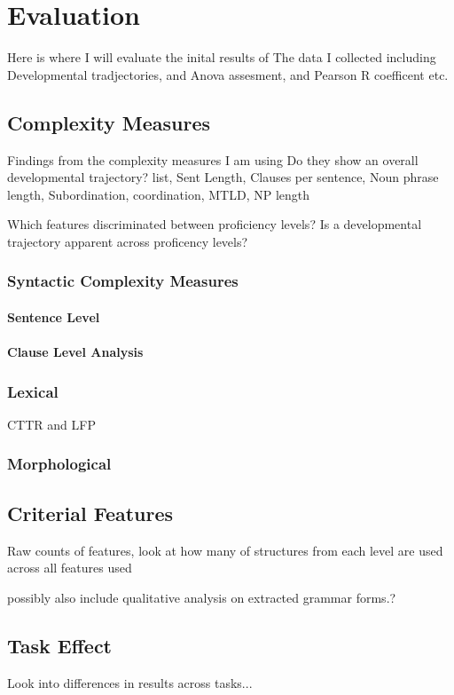 \chapter{Evaluation} 
Here is where I will evaluate the inital results of The data I collected including Developmental tradjectories, and 
Anova assesment, and Pearson R coefficent etc. 
\section{Complexity Measures}
Findings from the complexity measures I am using
Do they show an overall developmental trajectory?
list, Sent Length, Clauses per sentence, Noun phrase length,  Subordination, coordination, MTLD, NP length

Which features discriminated between proficiency levels?
Is a developmental trajectory apparent across proficency levels?

\subsection{Syntactic Complexity Measures}
\subsubsection{Sentence Level}


\subsubsection{Clause Level Analysis}

\subsection{Lexical}
CTTR and LFP 

\subsection{Morphological}


\section{Criterial Features}
Raw counts of features, 
look at how many of structures from each level are used across all features used


possibly also include qualitative analysis on extracted grammar forms.?

\section{Task Effect}
Look into differences in results across tasks...